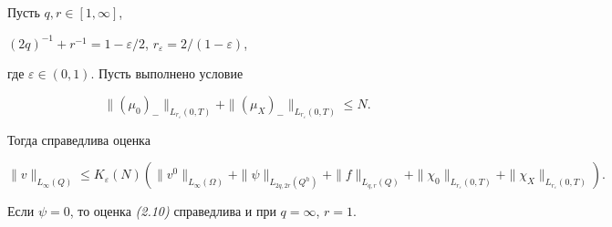 \documentclass[12pt]{article}
\theoremstyle{plain} %
\newtheorem{lemm}{\hskip\parindent Лемма}[section]
\theoremstyle{definition}
\numberwithin{equation}{section}
\begin{document}
\begin{lemm} Пусть $q,r\in [1,\infty]$,


$(2q)^{-1}+ r^{-1}=1-\varepsilon/2$, $r_\varepsilon=2/(1-\varepsilon)$,


где $\varepsilon\in (0,1)$. Пусть выполнено условие


\begin{equation}


\|(\mu_0)_-\|_{L_{r_\varepsilon}(0,T)}+


\|(\mu_X)_-\|_{L_{r_\varepsilon}(0,T)}\le N.


\end{equation}


Тогда справедлива оценка


\begin{equation}


\|v\|_{L_\infty(Q)}\le K_\varepsilon(N)(\|v^0\|_{L_\infty(\Omega)}+


\|\psi\|_{L_{2q,2r}(Q^h)}+\|f\|_{L_{q,r}(Q)}+


\|\chi_0\|_{L_{r_\varepsilon}(0,T)}+


\|\chi_X\|_{L_{r_\varepsilon}(0,T)}).


\end{equation}





Если $\psi=0$, то оценка {\em (2.10)} справедлива и при $q=\infty$, $r=1$.


\end{lemm}
\end{document}

